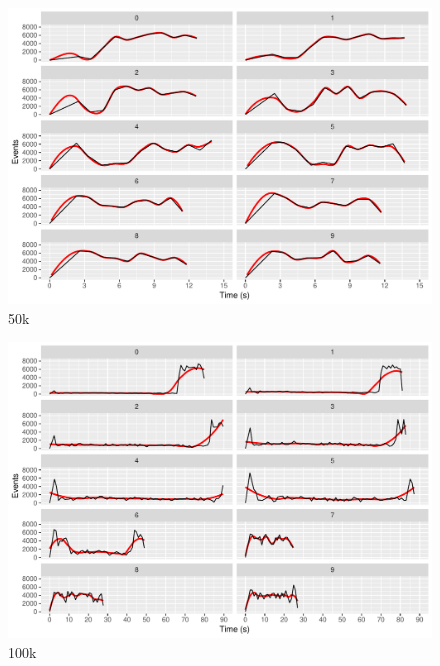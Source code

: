 \begin{figure}[h]
        \includegraphics[width=\textwidth]{gfx/config-comparison_50k.pdf}
        \caption{50k}
        \label{fig:evaluation:performance:config-comparison_50k}
\end{figure}

\begin{figure}[h]
        \includegraphics[width=\textwidth]{gfx/config-comparison_100k.pdf}
        \caption{100k}
        \label{fig:evaluation:performance:config-comparison_100k}
\end{figure}

